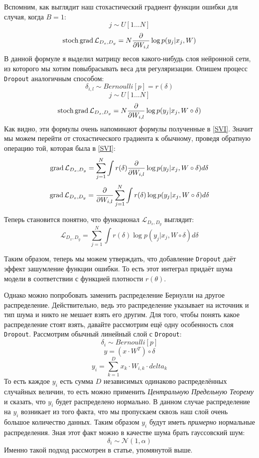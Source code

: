 Вспомним, как выглядит наш стохастический градиент функции ошибки для случая, когда $B=1$:
$$j \sim U[1...N]$$
$$\operatorname*{stoch} \operatorname*{grad} \mathcal{L}_{D_x, D_y} = N \frac{\partial}{\partial W_{i,l}} \log p(y_j | x_j, W)$$
В данной формуле я выделил матрицу весов какого-нибудь слоя нейронной сети, из которого мы хотим повыбрасывать веса для регуляризации. Опишем процесс \verb|Dropout|
 аналогичным способом:
$$\delta_{i,l} \sim Bernoulli[p] = r(\delta)$$
$$j \sim U[1...N]$$
$$\operatorname*{stoch} \operatorname*{grad} \mathcal{L}_{D_x, D_y} = N \frac{\partial}{\partial W_{i,l}} \log p(y_j | x_j, W \circ \delta)$$
Как видно, эти формулы очень напоминают формулы полученные в \ref{SVI}. Значит мы можем перейти от стохастического градиента к обычному, проведя обратную операцию той, которая была в \ref{SVI}:
$$\operatorname*{grad} \mathcal{L}_{D_x, D_y} = \sum_{j=1}^N \int r(\delta) \frac{\partial}{\partial W_{i,l}} \log p(y_j | x_j, W \circ \delta) d\delta$$
$$\operatorname*{grad} \mathcal{L}_{D_x, D_y} = \frac{\partial}{\partial W_{i,l}}\sum_{j=1}^N \int r(\delta) \log p(y_j | x_j, W \circ \delta) d\delta$$

Теперь становится понятно, что функционал $\mathcal{L}_{D_x, D_y}$ выглядит:
$$\mathcal{L}_{D_x, D_y} = \sum_{j=1}^N \int r(\delta) \log p(y_j | x_j, W \circ \delta) d\delta$$

Таким образом, теперь мы можем утверждать, что добавление \verb|Dropout| даёт эффект зашумление функции ошибки. То есть этот интеграл придаёт шума модели в соответствии с функцией плотности $r(\theta)$.

Однако можно попробовать заменить распределение Бернулли на другое распределение. Действительно, ведь это распределение указывает на источник и тип шума и никто не мешает взять его другим.
 Для того, чтобы понять какое распределение стоят взять, давайте рассмотрим ещё одну особенность слоя \verb|Dropout|. Рассмотрим обычный линейный слой с \verb|Dropout|:
$$\delta_i \sim Bernoulli[p]$$
$$y = (x \cdot W^T) \circ \delta$$
$$y_i = \sum_{k=1}^D x_k \cdot W_{i,k} \cdot delta_k$$
То есть каждое $y_i$ есть сумма $D$ независимых одинаково распределённых случайных величин, то есть можно применить \textit{Центральную Предельную Теорему} и сказать, что $y_i$ будет распределено нормально. В данном случае распределение на $y_i$
 возникает из того факта, что мы пропускаем сквозь наш слой очень большое количество данных. Таким образом $y_i$ будут иметь \textit{примерно} нормальные распределения. Зная этот факт можно в качестве шума брать гауссовский шум:
$$\delta_i \sim \mathcal{N}(1, \alpha)$$
Именно такой подход рассмотрен в статье, упомянутой выше.

